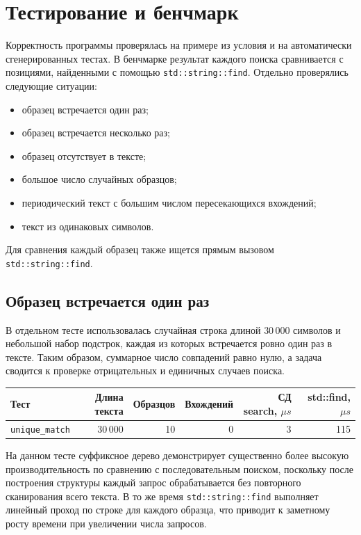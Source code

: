 \section{Тестирование и бенчмарк}

Корректность программы проверялась на примере из условия и на автоматически сгенерированных тестах.
В бенчмарке результат каждого поиска сравнивается с позициями, найденными с помощью
\texttt{std::string::find}. Отдельно проверялись следующие ситуации:
\begin{itemize}
\item образец встречается один раз;
\item образец встречается несколько раз;
\item образец отсутствует в тексте;
\item большое число случайных образцов;
\item периодический текст с большим числом пересекающихся вхождений;
\item текст из одинаковых символов.
\end{itemize}

Для сравнения каждый образец также ищется прямым вызовом \texttt{std::string::find}.

\subsection{Образец встречается один раз}

В отдельном тесте использовалась случайная строка длиной $30\,000$ символов и небольшой набор
подстрок, каждая из которых встречается ровно один раз в тексте. Таким образом, суммарное число
совпадений равно нулю, а задача сводится к проверке отрицательных и единичных случаев поиска.

\begin{center}
\small
\begin{tabular}{|l|r|r|r|r|r|}
\hline
\rowcolor{lightgray}
Тест & Длина текста & Образцов & Вхождений & СД search, \(\mu s\) & std::find, \(\mu s\) \\
\hline
\texttt{unique\_match} & 30\,000 & 10 & 0 & 3 & 115 \\
\hline
\end{tabular}
\end{center}

На данном тесте суффиксное дерево демонстрирует существенно более высокую производительность
по сравнению с последовательным поиском, поскольку после построения структуры каждый запрос
обрабатывается без повторного сканирования всего текста. В то же время \texttt{std::string::find}
выполняет линейный проход по строке для каждого образца, что приводит к заметному росту времени
при увеличении числа запросов.

